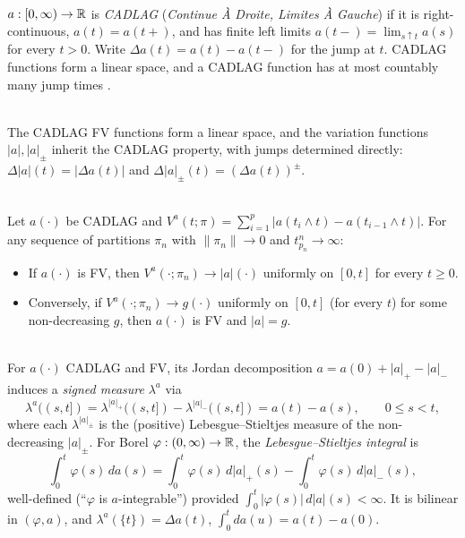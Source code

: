 \begin{definition} \label{chap4.0:definition-cadlag_function}  \\
$a:[0,\infty)\to\mathbb{R}$ is \textit{CADLAG} (\textit{Continue \`A Droite, Limites \`A Gauche}) if it is right-continuous, $a(t)=a(t+)$, and has finite left limits $a(t-)=\lim_{s\uparrow t}a(s)$ for every $t>0$. Write $\Delta a(t)=a(t)-a(t-)$ for the jump at $t$. CADLAG functions form a linear space, and a CADLAG function has at most countably many jump times .
\end{definition}

\begin{proposition} \label{chap4.0:proposition-cadlag_fv_functions}  \\
The CADLAG FV functions form a linear space, and the variation functions $|a|,|a|_\pm$ inherit the CADLAG property, with jumps determined directly: $\Delta|a|(t)=|\Delta a(t)|$ and $\Delta|a|_\pm(t)=(\Delta a(t))^\pm$.
\end{proposition}

\begin{theorem} \label{chap4.0:theorem-fv_characterisation}  \\
Let $a(\cdot)$ be CADLAG and $V^a(t;\pi)=\sum_{i=1}^p|a(t_i\wedge t)-a(t_{i-1}\wedge t)|$. For any sequence of partitions $\pi_n$ with $\|\pi_n\|\to0$ and $t^n_{p_n}\to\infty$:
\begin{itemize}
    \item If $a(\cdot)$ is FV, then $V^a(\cdot;\pi_n)\to|a|(\cdot)$ uniformly on $[0,t]$ for every $t\ge0$.
    \item Conversely, if $V^a(\cdot;\pi_n)\to g(\cdot)$ uniformly on $[0,t]$ (for every $t$) for some non-decreasing $g$, then $a(\cdot)$ is FV and $|a|=g$.
\end{itemize}
\end{theorem}

\begin{definition} \label{chap4.0:definition-lebesgue_stieltjes}  \\
For $a(\cdot)$ CADLAG and FV, its Jordan decomposition $a=a(0)+|a|_+-|a|_-$ induces a \textit{signed measure} $\lambda^a$ via
$$\lambda^a((s,t])=\lambda^{|a|_+}((s,t])-\lambda^{|a|_-}((s,t])=a(t)-a(s), \qquad 0\le s<t,$$
where each $\lambda^{|a|_\pm}$ is the (positive) Lebesgue--Stieltjes measure of the non-decreasing $|a|_\pm$. For Borel $\varphi:(0,\infty)\to\mathbb{R}$, the \textit{Lebesgue--Stieltjes integral} is
$$\int_0^t\varphi(s)\,da(s)=\int_0^t\varphi(s)\,d|a|_+(s)-\int_0^t\varphi(s)\,d|a|_-(s),$$
well-defined (``$\varphi$ is $a$-integrable'') provided $\int_0^t|\varphi(s)|\,d|a|(s)<\infty$. It is bilinear in $(\varphi,a)$, and $\lambda^a(\{t\})=\Delta a(t)$, $\int_0^t da(u)=a(t)-a(0)$.
\end{definition}

